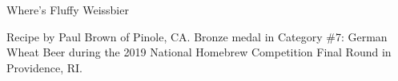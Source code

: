 \begin{recipe}{Where's Fluffy Weissbier}

\begin{aboutblock}
Recipe by Paul Brown of Pinole, CA. Bronze medal in Category \#7: German Wheat
Beer during the 2019 National Homebrew Competition Final Round in Providence, RI. \sourceaha
\end{aboutblock}


\begin{methodandtiming}
 
\begin{mashsteps}
\end{mashsteps}

\begin{fermentationsteps}
\end{fermentationsteps}

\end{methodandtiming}

\recipebreak

\begin{ingredientsblock}

\begin{malts}
\end{malts}

\begin{hops}
\end{hops}


\end{ingredientsblock}

\end{recipe}
